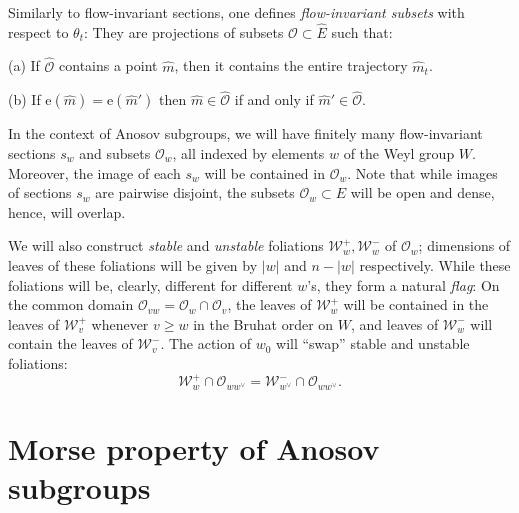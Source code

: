 \documentclass[12pt]{amsbook}%
\theoremstyle{definition}
\theoremstyle{remark}
\numberwithin{section}{chapter}
\numberwithin{subsection}{section}
\numberwithin{figure}{chapter}
\def\cO{{\mathscr{O}}}
\def\cW{{\mathscr{W}}}
\begin{document}
{{Similarly to flow-invariant sections, one defines {\em flow-invariant subsets} with respect to $\theta_t$: 
They are projections of subsets $\widehat\cO\subset \widehat E$ such that:

(a) If $\widehat \cO$ contains a point $\hat m$, then it contains the entire trajectory $\hat m_t$. 

(b) If $\mathrm{e}(\hat m)= \mathrm{e}(\hat m')$ then $\hat m\in \widehat \cO$ if and only if $\hat m'\in \widehat \cO$. 


\medskip 

In the context of Anosov subgroups, we will have finitely many flow-invariant sections $s_w$ and subsets $\cO_w$, all indexed by elements $w$ of the Weyl group $W$. Moreover, the image of each $s_w$ will be contained in $\cO_w$. 
Note that while images of sections $s_w$ are pairwise disjoint, the subsets 
$\cO_w\subset E$ will be open and dense, hence, will overlap. 


We will also construct {\em stable} and {\em unstable} foliations $\cW^+_w, \cW^-_w$ of  $\cO_w$; dimensions of leaves of these foliations will be given by 
$|w|$ and $n-|w|$ respectively. While these foliations will be, clearly, different for different $w$'s, they form a natural {\em flag}: 
On the common domain $\cO_{vw}=\cO_w\cap \cO_v$, the leaves of $\cW^+_w$ will be contained in the leaves of   $\cW^+_v$ 
whenever $v\ge w$ in the Bruhat order on $W$, 
and leaves of $\cW^-_w$ will contain the leaves of $\cW^-_v$. 
The action of $w_0$ will ``swap''  stable and unstable foliations:
$$
\cW^+_w \cap \cO_{ww^\vee}= \cW^-_{w^\vee} \cap \cO_{ww^\vee}. 
$$

\section{Morse property of Anosov subgroups}


}}
\end{document}
